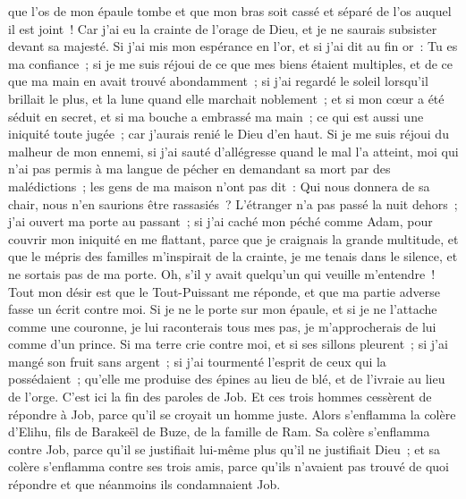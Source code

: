 \begin{multicols}{2}
que l'os de mon épaule tombe et que mon bras soit cassé et séparé de l'os auquel il est joint~!
Car j'ai eu la crainte de l'orage de Dieu, et je ne saurais subsister devant sa majesté.
Si j'ai mis mon espérance en l'or, et si j'ai dit au fin or~: Tu es ma confiance~;
si je me suis réjoui de ce que mes biens étaient multiples, et de ce que ma main en avait trouvé abondamment~;
si j'ai regardé le soleil lorsqu'il brillait le plus, et la lune quand elle marchait noblement~;
et si mon cœur a été séduit en secret, et si ma bouche a embrassé ma main~;
ce qui est aussi une iniquité toute jugée~; car j'aurais renié le Dieu d'en haut.
Si je me suis réjoui du malheur de mon ennemi, si j'ai sauté d'allégresse quand le mal l'a atteint,
moi qui n'ai pas permis à ma langue de pécher en demandant sa mort par des malédictions~;
les gens de ma maison n'ont pas dit~: Qui nous donnera de sa chair, nous n'en saurions être rassasiés~?
L'étranger n'a pas passé la nuit dehors~; j'ai ouvert ma porte au passant~;
si j'ai caché mon péché comme Adam, pour couvrir mon iniquité en me flattant,
parce que je craignais la grande multitude, et que le mépris des familles m'inspirait de la crainte, je me tenais dans le silence, et ne sortais pas de ma porte.
Oh, s'il y avait quelqu'un qui veuille m'entendre~! Tout mon désir est que le Tout-Puissant me réponde, et que ma partie adverse fasse un écrit contre moi.
Si je ne le porte sur mon épaule, et si je ne l'attache comme une couronne,
je lui raconterais tous mes pas, je m'approcherais de lui comme d'un prince.
Si ma terre crie contre moi, et si ses sillons pleurent~;
si j'ai mangé son fruit sans argent~; si j'ai tourmenté l'esprit de ceux qui la possédaient~;
qu'elle me produise des épines au lieu de blé, et de l'ivraie au lieu de l'orge. C'est ici la fin des paroles de Job.
\VerseOne{}Et ces trois hommes cessèrent de répondre à Job, parce qu'il se croyait un homme juste.
Alors s'enflamma la colère d'Elihu, fils de Barakeël de Buze, de la famille de Ram. Sa colère s'enflamma contre Job, parce qu'il se justifiait lui-même plus qu'il ne justifiait Dieu~;
et sa colère s'enflamma contre ses trois amis, parce qu'ils n'avaient pas trouvé de quoi répondre et que néanmoins ils condamnaient Job.

\end{multicols}
